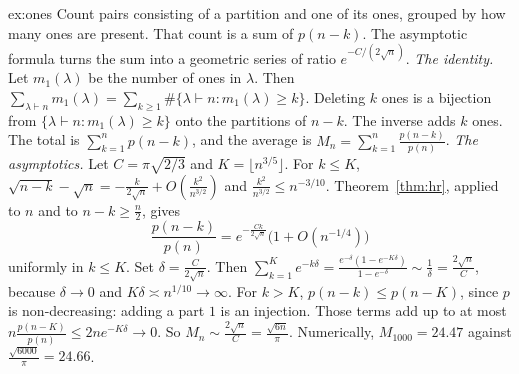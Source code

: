 \begin{solution}{ex:ones}
\idea Count pairs consisting of a partition and one of its ones, grouped by how many ones are present. That count is a sum of $p(n-k)$. The asymptotic formula turns the sum into a geometric series of ratio $e^{-C/(2\sqrt n)}$.
\writeup \emph{The identity.} Let $m_1(\lambda)$ be the number of ones in $\lambda$. Then $\sum_{\lambda\vdash n}m_1(\lambda)=\sum_{k\ge1}\#\{\lambda\vdash n:m_1(\lambda)\ge k\}$. Deleting $k$ ones is a bijection from $\{\lambda\vdash n:m_1(\lambda)\ge k\}$ onto the partitions of $n-k$. The inverse adds $k$ ones. The total is $\sum_{k=1}^np(n-k)$, and the average is $M_n=\sum_{k=1}^n\frac{p(n-k)}{p(n)}$.
\emph{The asymptotics.} Let $C=\pi\sqrt{2/3}$ and $K=\lfloor n^{3/5}\rfloor$. For $k\le K$, $\sqrt{n-k}-\sqrt n=-\frac k{2\sqrt n}+O(\frac{k^2}{n^{3/2}})$ and $\frac{k^2}{n^{3/2}}\le n^{-3/10}$. Theorem~\ref{thm:hr}, applied to $n$ and to $n-k\ge\frac n2$, gives
\[
\frac{p(n-k)}{p(n)}=e^{-\frac{Ck}{2\sqrt n}}\bigl(1+O(n^{-1/4})\bigr)
\]
uniformly in $k\le K$. Set $\delta=\frac C{2\sqrt n}$. Then $\sum_{k=1}^Ke^{-k\delta}=\frac{e^{-\delta}(1-e^{-K\delta})}{1-e^{-\delta}}\sim\frac1\delta=\frac{2\sqrt n}C$, because $\delta\to0$ and $K\delta\asymp n^{1/10}\to\infty$. For $k>K$, $p(n-k)\le p(n-K)$, since $p$ is non-decreasing: adding a part $1$ is an injection. Those terms add up to at most $n\frac{p(n-K)}{p(n)}\le2ne^{-K\delta}\to0$. So $M_n\sim\frac{2\sqrt n}C=\frac{\sqrt{6n}}\pi$. Numerically, $M_{1000}=24.47$ against $\frac{\sqrt{6000}}\pi=24.66$.
\end{solution}

